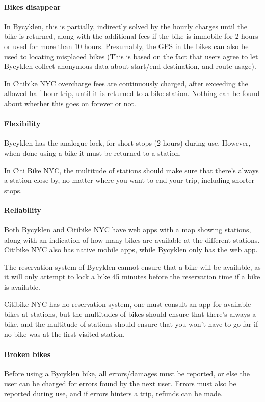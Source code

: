 \paragraph{Bikes disappear}
In Bycyklen, this is partially, indirectly solved by the hourly charges until the bike is returned, along with the additional fees if the bike is immobile for 2 hours or used for more than 10 hours.
Presumably, the GPS in the bikes can also be used to locating misplaced bikes (This is based on the fact that users agree to let Bycyklen collect anonymous data about start/end destination, and route usage).

In Citibike NYC overcharge fees are continuously charged, after exceeding the allowed half hour trip, until it is returned to a bike station.
Nothing can be found about whether this goes on forever or not.

\paragraph{Flexibility}
Bycyklen has the analogue lock, for short stops (2 hours) during use.
However, when done using a bike it must be returned to a station.

In Citi Bike NYC, the multitude of stations should make sure that there's always a station close-by, no matter where you want to end your trip, including shorter stops.

\paragraph{Reliability}
Both Bycyklen and Citibike NYC have web apps with a map showing stations, along with an indication of how many bikes are available at the different stations.
Citibike NYC also has native mobile apps, while Bycyklen only has the web app.

The reservation system of Bycyklen cannot ensure that a bike will be available, as it will only attempt to lock a bike 45 minutes before the reservation time if a bike is available.

Citibike NYC has no reservation system, one must consult an app for available bikes at stations, but the multitudes of bikes should ensure that there's always a bike, and the multitude of stations should ensure that you won't have to go far if no bike was at the first visited station.

\paragraph{Broken bikes}
Before using a Bycyklen bike, all errors/damages must be reported, or else the user can be charged for errors found by the next user.
Errors must also be reported during use, and if errors hinters a trip, refunds can be made.

